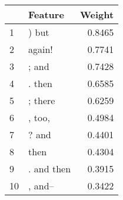 \begin{tabular}{llr}
\toprule
{} &     Feature &  Weight \\
\midrule
1  &       ) but &  0.8465 \\
2  &      again! &  0.7741 \\
3  &       ; and &  0.7428 \\
4  &      . then &  0.6585 \\
5  &     ; there &  0.6259 \\
6  &      , too, &  0.4984 \\
7  &       ? and &  0.4401 \\
8  &        then &  0.4304 \\
9  &  . and then &  0.3915 \\
10 &     , and-- &  0.3422 \\
\bottomrule
\end{tabular}

